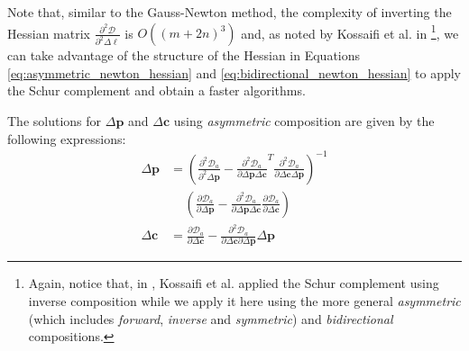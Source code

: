 Note that, similar to the Gauss-Newton method, the complexity of inverting the Hessian matrix $\frac{\partial^2 \mathcal{D}}{\partial^2 \Delta \boldsymbol{\ell}}$ is $O((m+2n)^3)$ and, as noted by Kossaifi et al. in \cite{Kossaifi2014}\footnote{Again, notice that, in \cite{Kossaifi2014}, Kossaifi et al. applied the Schur complement using inverse composition while we apply it here using the more general \emph{asymmetric} (which includes \emph{forward}, \emph{inverse} and \emph{symmetric}) and \emph{bidirectional} compositions.}, we can take advantage of the structure of the Hessian in Equations \ref{eq:asymmetric_newton_hessian} and \ref{eq:bidirectional_newton_hessian} to apply the Schur complement and obtain a faster algorithms. 

The solutions for $\Delta\mathbf{p}$ and $\Delta\mathbf{c}$ using \emph{asymmetric} composition are given by the following expressions:
\begin{equation}
    \begin{aligned}
        \Delta \mathbf{p} & = \left(\frac{\partial^2 \mathcal{D}_a}{\partial^2 \Delta \mathbf{p}} - \frac{\partial^2 \mathcal{D}_a}{\partial \Delta \mathbf{p} \Delta \mathbf{c}}^T \frac{\partial^2 \mathcal{D}_a}{\partial \Delta \mathbf{c} \Delta \mathbf{p}} \right)^{-1} 
        \\ 
        & \quad \, \left( \frac{\partial \mathcal{D}_a}{\partial \Delta \mathbf{p}} - \frac{\partial^2 \mathcal{D}_a}{\partial \Delta \mathbf{p} \Delta \mathbf{c}} \frac{\partial \mathcal{D}_a}{\partial \Delta \mathbf{c}} \right)
    	\\
        \Delta \mathbf{c} & = \frac{\partial \mathcal{D}_a}{\partial \Delta \mathbf{c}} - \frac{\partial^2 \mathcal{D}_a}{\partial \Delta \mathbf{c} \partial \Delta \mathbf{p}} \Delta \mathbf{p}
    \label{eq:asymmetric_newton_schur_solutions}
    \end{aligned}
\end{equation}

